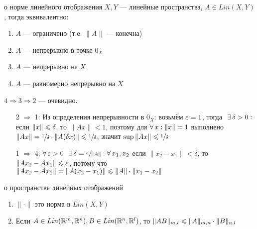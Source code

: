 \begin{lem}[https://youtu.be/OazzLm0DJN4?si=Qwpn9tVeLwf_T6DS&t=1617]{о норме линейного отображения}
	$X, Y$ --- линейные пространства, $A \in Lin(X, Y)$, тогда эквивалентно:
	\begin{multicols}{2}\begin{enumerate}[itemindent=20pt]
		\item $A$ --- ограничено (т.е. $\|A\|$ --- конечна)
		
		\item $A$ --- непрерывно в точке $0_X$
		
		\item $A$ --- непрерывно на $X$
		
		\item $A$ --- равномерно непрерывно на $X$
	\end{enumerate}\end{multicols}
\end{lem}

\begin{prf}
	$4 \Rightarrow 3 \Rightarrow 2$ --- очевидно.
	\begin{itemize}[leftmargin=55pt]
		\item[2 $\Rightarrow$ 1:]  
		Из определения непрерывности в $0_X$: возьмём $\varepsilon = 1$, тогда$\E \delta > 0 :{}$если $\|x\| \leqslant \delta$, то $\|Ax\| < 1$, поэтому для $\forall \, x : \|x\| = 1$ выполнено $\|Ax\| = \sfrac{1}{\delta} \cdot \|A (\delta x)\| \leqslant \sfrac{1}{\delta}$, значит $\sup\|Ax\| \leqslant \sfrac{1}{\delta}$\medskip
		
		\item[1 $\Rightarrow$ 4:] $\A \eps > 0 \E \delta = \sfrac{\eps}{\|A\|} : \A x_1, x_2$ если $\|x_2 - x_1\| < \delta$, то $\|Ax_2 - Ax_1\| \leqslant \varepsilon$, потому что $\|Ax_2 - Ax_1\| = \|A(x_2 - x_1)\| \leqslant \|A\| \cdot \|x_1 - x_2\|$
	\end{itemize}
\end{prf}
\vspace{-15pt}
\begin{teor}[https://youtu.be/OazzLm0DJN4?si=rQwhPft7RLfNzztG&t=2414]{о пространстве линейных отображений}
	\vspace{-15pt}
	\begin{enumerate}
		\item $\|\cdot\|$ это норма в $Lin(X, Y)$
		
		\item Если $A \in Lin(\mathbb R^m, \mathbb R^n), B \in Lin(\mathbb R^n, \mathbb R^l)$, то $\|AB\|_{m,l} \leqslant \|A\|_{m, n} \cdot \|B\|_{n,l}$
	\end{enumerate}
\end{teor}


